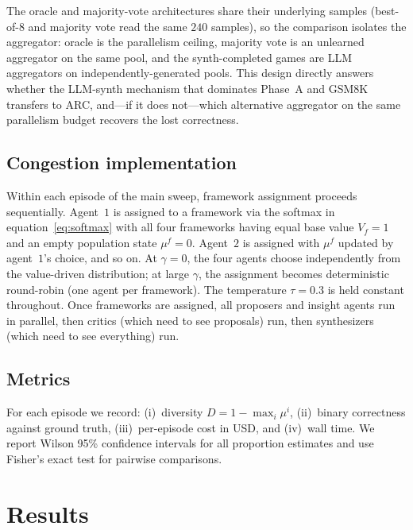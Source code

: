 \documentclass[11pt]{amsart}
\newcommand{\g}{\gamma}
\newcommand\1{{\mathds{1}}}
\theoremstyle{definition}
\theoremstyle{remark}
\numberwithin{equation}{section}
\begin{document}
The oracle and majority-vote architectures share their underlying samples (best-of-$8$ and majority vote read the same $240$ samples), so the comparison isolates the aggregator: oracle is the parallelism ceiling, majority vote is an unlearned aggregator on the same pool, and the synth-completed games are LLM aggregators on independently-generated pools.
This design directly answers whether the LLM-synth mechanism that dominates Phase~A and GSM8K transfers to ARC, and---if it does not---which alternative aggregator on the same parallelism budget recovers the lost correctness.

\subsection{Congestion implementation}\label{sec:congestion-impl}

Within each episode of the main sweep, framework assignment proceeds sequentially.
Agent~$1$ is assigned to a framework via the softmax in equation~\eqref{eq:softmax} with all four frameworks having equal base value $V_f = 1$ and an empty population state $\mu^f = 0$.
Agent~$2$ is assigned with $\mu^f$ updated by agent~$1$'s choice, and so on.
At $\g = 0$, the four agents choose independently from the value-driven distribution; at large $\g$, the assignment becomes deterministic round-robin (one agent per framework).
The temperature $\tau = 0.3$ is held constant throughout.
Once frameworks are assigned, all proposers and insight agents run in parallel, then critics (which need to see proposals) run, then synthesizers (which need to see everything) run.

\subsection{Metrics}\label{sec:metrics}

For each episode we record: (i)~diversity $D = 1 - \max_i \mu^i$, (ii)~binary correctness against ground truth, (iii)~per-episode cost in USD, and (iv)~wall time.
We report Wilson 95\% confidence intervals \cite{Wilson1927} for all proportion estimates and use Fisher's exact test for pairwise comparisons.

\section{Results}\label{sec:results}
\end{document}

